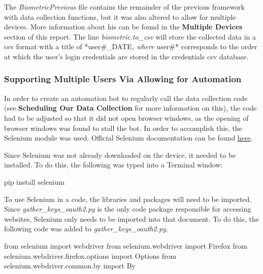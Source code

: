 \documentclass[]{book}
\newenvironment{Shaded}{\begin{snugshade}}{\end{snugshade}}
\newcommand{\ImportTok}[1]{#1}
\newcommand{\NormalTok}[1]{#1}
\begin{document}
The \emph{BiometricPrevious} file contains the remainder of the previous
framework with data collection functions, but it was also altered to
allow for multiple devices. More information about his can be found in
the \textbf{Multiple Devices} section of this report. The line
\emph{biometric.to\_csv} will store the collected data in a csv format
with a title of *user\#\_DATE\emph{, where }user\#* corresponds to the
order at which the user's login credentials are stored in the
credentials csv database.

\subsubsection{Supporting Multiple Users Via Allowing for
Automation}\label{supporting-multiple-users-via-allowing-for-automation}

In order to create an automation bot to regularly call the data
collection code (see \textbf{Scheduling Our Data Collection} for more
information on this), the code had to be adjusted so that it did not
open browser windows, as the opening of browser windows was found to
stall the bot. In order to accomplish this, the Selenium module was
used. Official Selenium documentation can be found
\href{https://selenium-python.readthedocs.io}{here}.

Since Selenium was not already downloaded on the device, it needed to be
installed. To do this, the following was typed into a Terminal window:

\begin{Shaded}
\begin{Highlighting}[]
\NormalTok{pip install selenium}
\end{Highlighting}
\end{Shaded}

To use Selenium in a code, the libraries and packages will need to be
imported. Since \emph{gather\_keys\_oauth2.py} is the only code package
responsible for accessing websites, Selenium only needs to be imported
into that document. To do this, the following code was added to
\emph{gather\_keys\_oauth2.py}.

\begin{Shaded}
\begin{Highlighting}[]
\ImportTok{from}\NormalTok{ selenium }\ImportTok{import}\NormalTok{ webdriver}
\ImportTok{from}\NormalTok{ selenium.webdriver }\ImportTok{import}\NormalTok{ Firefox}
\ImportTok{from}\NormalTok{ selenium.webdriver.firefox.options }\ImportTok{import}\NormalTok{ Options}
\ImportTok{from}\NormalTok{ selenium.webdriver.common.by }\ImportTok{import}\NormalTok{ By}
\end{Highlighting}
\end{Shaded}
\end{document}
